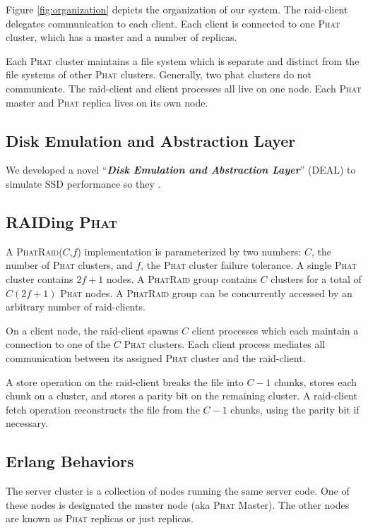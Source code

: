 \documentclass[10pt,letter]{article}
\newcommand{\phat}[0]{\textsc{Phat}}
\newcommand{\phatraid}[0]{\textsc{PhatRaid}}
\newcommand{\phatraidcf}[2]{\textsc{PhatRaid}(#1,#2)}
\begin{document}
Figure \ref{fig:organization} depicts the organization of our system. The
raid-client delegates communication to each client. Each client is connected to
one \phat{} cluster, which has a master and a number of replicas.

Each \phat{} cluster maintains a file system which is separate and distinct from
the file systems of other \phat{} clusters. Generally, two phat clusters do not
communicate. The raid-client and client processes all live on one node. Each
\phat{} master and \phat{} replica lives on its own node.

\subsection{Disk Emulation and Abstraction Layer}

We developed a novel ``{\bf {\em Disk Emulation and Abstraction Layer}}'' (DEAL)
to simulate SSD performance so they .

\subsection{RAIDing \phat{}}

A \phatraidcf{$C$}{$f$} implementation is parameterized by two numbers: $C$, the
number of \phat{} clusters, and $f$, the \phat{} cluster failure tolerance. A
single \phat{} cluster contains $2f + 1$ nodes. A \phatraid{} group contains $C$
clusters for a total of $C(2f+1)$ \phat{} nodes. A \phatraid{} group can be
concurrently accessed by an arbitrary number of raid-clients.

On a client node, the raid-client spawns $C$ client processes which each
maintain a connection to one of the $C$ \phat{} clusters. Each client process
mediates all communication between its assigned \phat{} cluster and the
raid-client.

A store operation on the raid-client breaks the file into $C-1$ chunks, stores
each chunk on a cluster, and stores a parity bit on the remaining cluster. A
raid-client fetch operation reconstructs the file from the $C-1$ chunks, using
the parity bit if necessary.

\subsection{Erlang Behaviors}

The server cluster is a collection of nodes running the same server code. One of
these nodes is designated the master node (aka \phat{} Master). The other nodes are
known as \phat{} replicas or just replicas.
\end{document}
